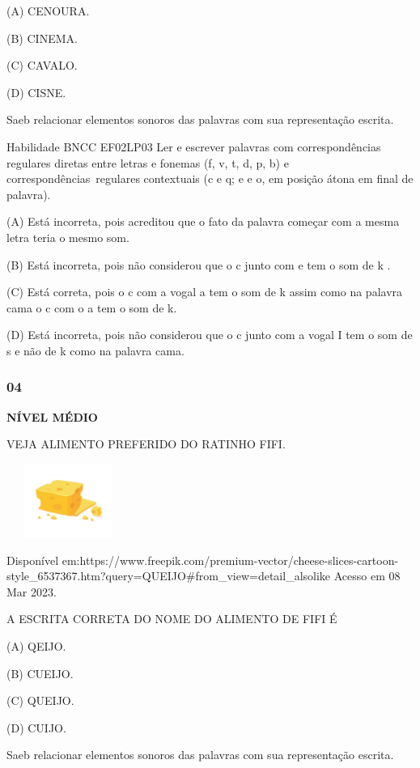 (A) CENOURA.

(B) CINEMA.

(C) CAVALO.

(D) CISNE.

\protect\hypertarget{_Hlk129152414}{}{\protect\hypertarget{_Hlk129151771}{}{}}Saeb
relacionar elementos sonoros das palavras com sua representação escrita.

Habilidade BNCC EF02LP03 Ler e escrever palavras com correspondências
regulares diretas entre letras e fonemas (f, v, t, d, p, b) e
correspondências~regulares contextuais (c e q; e e o, em posição átona
em final de palavra).

(A) Está incorreta, pois acreditou que o fato da palavra começar com a
mesma letra teria o mesmo som.

(B) Está incorreta, pois não considerou que o c junto com e tem o som de
k .

(C) Está correta, pois o c com a vogal a tem o som de k assim como na
palavra cama o c com o a tem o som de k.

(D) Está incorreta, pois não considerou que o c junto com a vogal I tem
o som de s e não de k como na palavra cama.

\subsubsection{04}\label{section-97}

\textbf{NÍVEL MÉDIO}

VEJA ALIMENTO PREFERIDO DO RATINHO FIFI.

\includegraphics[width=1.56736in,height=0.94861in]{media/image141.jpeg}

Disponível
em:https://www.freepik.com/premium-vector/cheese-slices-cartoon-style\_6537367.htm?query=QUEIJO\#from\_view=detail\_alsolike
Acesso em 08 Mar 2023.

A ESCRITA CORRETA DO NOME DO ALIMENTO DE FIFI É

(A) QEIJO.

(B) CUEIJO.

(C) QUEIJO.

(D) CUIJO.

Saeb relacionar elementos sonoros das palavras com sua representação
escrita.

